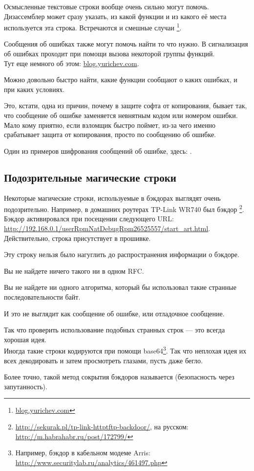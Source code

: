 Осмысленные текстовые строки вообще очень сильно могут помочь. 
Дизассемблер \IDA может сразу указать, из какой функции и из какого её места используется эта строка. 
Встречаются и смешные случаи
\footnote{\href{http://go.yurichev.com/17223}{blog.yurichev.com}}.

Сообщения об ошибках также могут помочь найти то что нужно. 
В \oracle сигнализация об ошибках проходит при помощи вызова некоторой группы функций. \\
Тут еще немного об этом: \href{http://go.yurichev.com/17224}{blog.yurichev.com}.

Можно довольно быстро найти, какие функции сообщают о каких ошибках, и при каких условиях.

Это, кстати, одна из причин, почему в защите софта от копирования, 
бывает так, что сообщение об ошибке заменяется 
невнятным кодом или номером ошибки. Мало кому приятно, если взломщик быстро поймет, 
из-за чего именно срабатывает защита от копирования, просто по сообщению об ошибке.

Один из примеров шифрования сообщений об ошибке, здесь: .

\subsection{Подозрительные магические строки}

Некоторые магические строки, используемые в бэкдорах выглядят очень подозрительно.
Например, в домашних роутерах TP-Link WR740 был бэкдор
\footnote{\url{http://sekurak.pl/tp-link-httptftp-backdoor/}, на русском: \url{http://m.habrahabr.ru/post/172799/}}.
Бэкдор активировался при посещении следующего URL:\\
\url{http://192.168.0.1/userRpmNatDebugRpm26525557/start_art.html}.\\
Действительно, строка  присутствует в прошивке.

Эту строку нельзя было нагуглить до распространения информации о бэкдоре.

Вы не найдете ничего такого ни в одном \ac{RFC}.

Вы не найдете ни одного алгоритма, который бы использовал такие странные последовательности байт.

И это не выглядит как сообщение об ошибке, или отладочное сообщение.

Так что проверить использование подобных странных строк --- это всегда хорошая идея.
\\
Иногда такие строки кодируются при помощи 
base64\footnote{Например, бэкдор в кабельном модеме Arris: 
\url{http://www.securitylab.ru/analytics/461497.php}}.
Так что неплохая идея их всех декодировать и затем просмотреть глазами, пусть даже бегло.
\\

Более точно, такой метод сокрытия бэкдоров называется  (безопасность через
запутанность).
